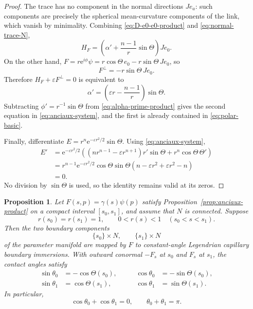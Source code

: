 \documentclass[11pt,a4paper]{article}
\numberwithin{equation}{section}
\newtheorem{proposition}[theorem]{Proposition}
\newcommand{\ee}{\mathrm e}
\begin{document}
\begin{proof}
The trace has no component in the normal directions $Je_a$: such components are precisely the spherical mean-curvature components of the link, which vanish by minimality.
Combining \eqref{eq:D-e0-e0-product} and \eqref{eq:normal-trace-N},
\begin{equation*}
H_F
=\left(\alpha'+\frac{n-1}{r}\sin\Theta\right)Je_0.
\end{equation*}
On the other hand,
$F=r\ee^{i\phi}\psi
=r\cos\Theta\,e_0-r\sin\Theta\,Je_0$,
so
\begin{equation*}
F^\perp=-r\sin\Theta\,Je_0.
\end{equation*}
Therefore $H_F+\varepsilon F^\perp=0$ is equivalent to
\begin{equation}\label{eq:alpha-prime-product}
\alpha'
=\left(\varepsilon r-\frac{n-1}{r}\right)\sin\Theta.
\end{equation}
Subtracting $\phi'=r^{-1}\sin\Theta$ from \eqref{eq:alpha-prime-product} gives the second equation in \eqref{eq:anciaux-system}, and the first is already contained in \eqref{eq:polar-basic}.

Finally, differentiate
$E=r^n\ee^{-\varepsilon r^2/2}\sin\Theta$.
Using \eqref{eq:anciaux-system},
\begin{align*}
E'
&=\ee^{-\varepsilon r^2/2}
\left((nr^{n-1}-\varepsilon r^{n+1})r'\sin\Theta
+r^n\cos\Theta\,\Theta'\right)\\
&=r^{n-1}\ee^{-\varepsilon r^2/2}\cos\Theta\sin\Theta
\left(n-\varepsilon r^2+\varepsilon r^2-n\right)\\
&=0.
\end{align*}
No division by $\sin\Theta$ is used, so the identity remains valid at its zeros.
\end{proof}


\begin{proposition}\label{prop:product-boundary-angles}
Let $F(s,p)=\gamma(s)\psi(p)$ satisfy Proposition~\ref{prop:anciaux-product} on a compact interval $[s_0,s_1]$, and assume that $N$ is connected.  Suppose
\begin{equation}\label{eq:product-unit-ball-segment}
        r(s_0)=r(s_1)=1,
        \qquad
        0<r(s)<1\quad(s_0<s<s_1).
\end{equation}
Then the two boundary components
\[
        \{s_0\}\times N,
        \qquad
        \{s_1\}\times N
\]
of the parameter manifold are mapped by $F$ to constant-angle Legendrian capillary boundary immersions.  With outward conormal $-F_s$ at $s_0$ and $F_s$ at $s_1$, the contact angles satisfy
\begin{equation}\label{eq:product-angle-components}
\begin{aligned}
        \sin\theta_0&=-\cos\Theta(s_0),
        &\qquad \cos\theta_0&=-\sin\Theta(s_0),\\
        \sin\theta_1&= \cos\Theta(s_1),
        &\qquad \cos\theta_1&= \sin\Theta(s_1).
\end{aligned}
\end{equation}
In particular,
\begin{equation}\label{eq:product-supplementary}
        \cos\theta_0+\cos\theta_1=0,
        \qquad
        \theta_0+\theta_1=\pi.
\end{equation}
\end{proposition}
\end{document}
